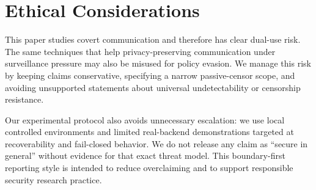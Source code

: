 \section{Ethical Considerations}
This paper studies covert communication and therefore has clear dual-use risk. The same techniques that help privacy-preserving communication under surveillance pressure may also be misused for policy evasion. We manage this risk by keeping claims conservative, specifying a narrow passive-censor scope, and avoiding unsupported statements about universal undetectability or censorship resistance.

Our experimental protocol also avoids unnecessary escalation: we use local controlled environments and limited real-backend demonstrations targeted at recoverability and fail-closed behavior. We do not release any claim as ``secure in general'' without evidence for that exact threat model. This boundary-first reporting style is intended to reduce overclaiming and to support responsible security research practice.

